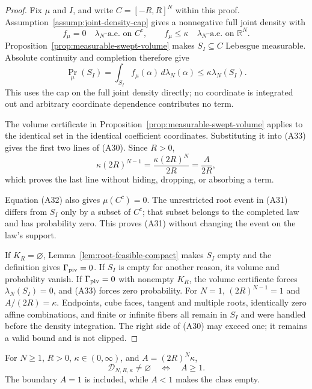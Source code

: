 \begin{proof}
Fix $\mu$ and $I$, and write $C=[-R,R]^N$ within this proof.
Assumption~\ref{assump:joint-density-cap} gives a nonnegative full joint
density with
\[
f_\mu=0\quad\lambda_N\text{-a.e. on }C^c,
\qquad
f_\mu\leq\kappa\quad\lambda_N\text{-a.e. on }\mathbb R^N.
\tag{A32}
\]
Proposition~\ref{prop:measurable-swept-volume} makes $S_I\subseteq C$
Lebesgue measurable.  Absolute continuity and completion therefore give
\[
\Pr_\mu(S_I)
=\int_{S_I}f_\mu(\alpha)\,d\lambda_N(\alpha)
\leq\kappa\lambda_N(S_I).
\tag{A33}
\]
This uses the cap on the full joint density directly; no coordinate is
integrated out and arbitrary coordinate dependence contributes no term.

The volume certificate in Proposition~\ref{prop:measurable-swept-volume}
applies to the identical set in the identical coefficient coordinates.
Substituting it into \textup{(A33)} gives the first two lines of
\textup{(A30)}.  Since $R>0$,
\[
\kappa(2R)^{N-1}
=\frac{\kappa(2R)^N}{2R}
=\frac A{2R},
\tag{A34}
\]
which proves the last line without hiding, dropping, or absorbing a term.

Equation \textup{(A32)} also gives $\mu(C^c)=0$.  The unrestricted root
event in \textup{(A31)} differs from $S_I$ only by a subset of $C^c$; that
subset belongs to the completed law and has probability zero.  This proves
\textup{(A31)} without changing the event on the law's support.

If $K_R=\varnothing$, Lemma~\ref{lem:root-feasible-compact} makes $S_I$
empty and the definition gives $\Gamma_{\rm piv}=0$.  If $S_I$ is empty
for another reason, its volume and probability vanish.  If
$\Gamma_{\rm piv}=0$ with nonempty $K_R$, the volume certificate forces
$\lambda_N(S_I)=0$, and \textup{(A33)} forces zero probability.  For
$N=1$, $(2R)^{N-1}=1$ and $A/(2R)=\kappa$.  Endpoints, cube faces,
tangent and multiple roots, identically zero affine combinations, and
finite or infinite fibers all remain in $S_I$ and were handled before the
density integration.  The right side of \textup{(A30)} may exceed one; it
remains a valid bound and is not clipped.
\end{proof}

\begin{lemma}
\label{lem:law-class-nonempty}
For $N\geq1$, $R>0$, $\kappa\in(0,\infty)$, and
$A=(2R)^N\kappa$,
\[
\mathcal D_{N,R,\kappa}\neq\varnothing
\quad\Longleftrightarrow\quad A\geq1.
\tag{A35}
\]
The boundary $A=1$ is included, while $A<1$ makes the class empty.
\end{lemma}

